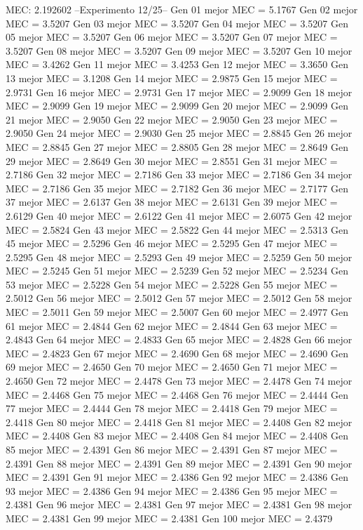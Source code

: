 MEC: 2.192602
--Experimento 
 12/25--
Gen 01 mejor MEC = 5.1767
Gen 02 mejor MEC = 3.5207
Gen 03 mejor MEC = 3.5207
Gen 04 mejor MEC = 3.5207
Gen 05 mejor MEC = 3.5207
Gen 06 mejor MEC = 3.5207
Gen 07 mejor MEC = 3.5207
Gen 08 mejor MEC = 3.5207
Gen 09 mejor MEC = 3.5207
Gen 10 mejor MEC = 3.4262
Gen 11 mejor MEC = 3.4253
Gen 12 mejor MEC = 3.3650
Gen 13 mejor MEC = 3.1208
Gen 14 mejor MEC = 2.9875
Gen 15 mejor MEC = 2.9731
Gen 16 mejor MEC = 2.9731
Gen 17 mejor MEC = 2.9099
Gen 18 mejor MEC = 2.9099
Gen 19 mejor MEC = 2.9099
Gen 20 mejor MEC = 2.9099
Gen 21 mejor MEC = 2.9050
Gen 22 mejor MEC = 2.9050
Gen 23 mejor MEC = 2.9050
Gen 24 mejor MEC = 2.9030
Gen 25 mejor MEC = 2.8845
Gen 26 mejor MEC = 2.8845
Gen 27 mejor MEC = 2.8805
Gen 28 mejor MEC = 2.8649
Gen 29 mejor MEC = 2.8649
Gen 30 mejor MEC = 2.8551
Gen 31 mejor MEC = 2.7186
Gen 32 mejor MEC = 2.7186
Gen 33 mejor MEC = 2.7186
Gen 34 mejor MEC = 2.7186
Gen 35 mejor MEC = 2.7182
Gen 36 mejor MEC = 2.7177
Gen 37 mejor MEC = 2.6137
Gen 38 mejor MEC = 2.6131
Gen 39 mejor MEC = 2.6129
Gen 40 mejor MEC = 2.6122
Gen 41 mejor MEC = 2.6075
Gen 42 mejor MEC = 2.5824
Gen 43 mejor MEC = 2.5822
Gen 44 mejor MEC = 2.5313
Gen 45 mejor MEC = 2.5296
Gen 46 mejor MEC = 2.5295
Gen 47 mejor MEC = 2.5295
Gen 48 mejor MEC = 2.5293
Gen 49 mejor MEC = 2.5259
Gen 50 mejor MEC = 2.5245
Gen 51 mejor MEC = 2.5239
Gen 52 mejor MEC = 2.5234
Gen 53 mejor MEC = 2.5228
Gen 54 mejor MEC = 2.5228
Gen 55 mejor MEC = 2.5012
Gen 56 mejor MEC = 2.5012
Gen 57 mejor MEC = 2.5012
Gen 58 mejor MEC = 2.5011
Gen 59 mejor MEC = 2.5007
Gen 60 mejor MEC = 2.4977
Gen 61 mejor MEC = 2.4844
Gen 62 mejor MEC = 2.4844
Gen 63 mejor MEC = 2.4843
Gen 64 mejor MEC = 2.4833
Gen 65 mejor MEC = 2.4828
Gen 66 mejor MEC = 2.4823
Gen 67 mejor MEC = 2.4690
Gen 68 mejor MEC = 2.4690
Gen 69 mejor MEC = 2.4650
Gen 70 mejor MEC = 2.4650
Gen 71 mejor MEC = 2.4650
Gen 72 mejor MEC = 2.4478
Gen 73 mejor MEC = 2.4478
Gen 74 mejor MEC = 2.4468
Gen 75 mejor MEC = 2.4468
Gen 76 mejor MEC = 2.4444
Gen 77 mejor MEC = 2.4444
Gen 78 mejor MEC = 2.4418
Gen 79 mejor MEC = 2.4418
Gen 80 mejor MEC = 2.4418
Gen 81 mejor MEC = 2.4408
Gen 82 mejor MEC = 2.4408
Gen 83 mejor MEC = 2.4408
Gen 84 mejor MEC = 2.4408
Gen 85 mejor MEC = 2.4391
Gen 86 mejor MEC = 2.4391
Gen 87 mejor MEC = 2.4391
Gen 88 mejor MEC = 2.4391
Gen 89 mejor MEC = 2.4391
Gen 90 mejor MEC = 2.4391
Gen 91 mejor MEC = 2.4386
Gen 92 mejor MEC = 2.4386
Gen 93 mejor MEC = 2.4386
Gen 94 mejor MEC = 2.4386
Gen 95 mejor MEC = 2.4381
Gen 96 mejor MEC = 2.4381
Gen 97 mejor MEC = 2.4381
Gen 98 mejor MEC = 2.4381
Gen 99 mejor MEC = 2.4381
Gen 100 mejor MEC = 2.4379

